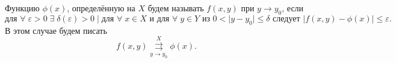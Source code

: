 \begin{col-answer-preambule}
	Функцию $\phi(x)$, определённую на $X$ будем называть  $f(x,y)$ при $y \to y_0$, если 
	\begin{equation}
	\label{eq:lecture04-04}
	\text{для } \forall \; \varepsilon > 0 \; \exists \; \delta (\varepsilon) > 0 \; | \; \text{для } \forall \; x \in X \text{ и для } \forall \; y \in Y \text{ из } 0 < |y-y_0| \leqslant \delta \text{ следует } |f(x,y) - \phi(x)| \leqslant \varepsilon.
	\end{equation}
	В этом случае будем писать
	\begin{equation}
	\label{eq:lecture04-05}
	f(x,y) \overset{X}{\underset{y \to y_0}{\rightrightarrows}} \phi(x).
	\end{equation}
\end{col-answer-preambule}

